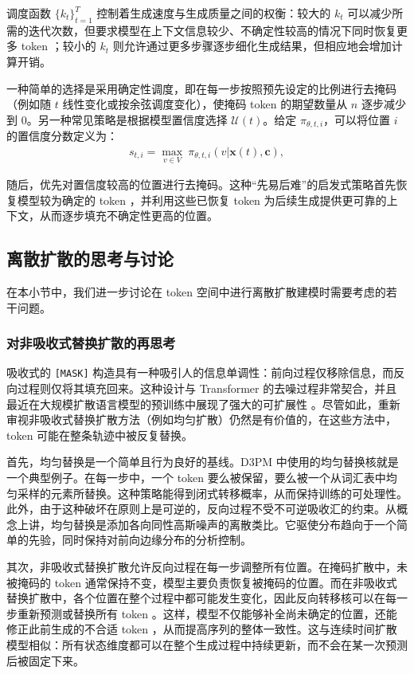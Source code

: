 \noindent 调度函数 $\{k_t\}_{t=1}^T$ 控制着生成速度与生成质量之间的权衡：较大的 $k_t$ 可以减少所需的迭代次数，但要求模型在上下文信息较少、不确定性较高的情况下同时恢复更多 token ；较小的 $k_t$ 则允许通过更多步骤逐步细化生成结果，但相应地会增加计算开销。

一种简单的选择是采用确定性调度，即在每一步按照预先设定的比例进行去掩码（例如随 $t$ 线性变化或按余弦调度变化），使掩码 token 的期望数量从 $n$ 逐步减少到 $0$。另一种常见策略是根据模型置信度选择 $\mathcal{U}(t)$。给定 $\pi_{\theta,t,i}$，可以将位置 $i$ 的置信度分数定义为：
\begin{eqnarray}
s_{t,i} = \max_{v\in V}\ \pi_{\theta,t,i}\!\left(v| \mathbf{x}(t),\mathbf{c}\right),
\end{eqnarray}

\noindent 随后，优先对置信度较高的位置进行去掩码。这种“先易后难”的启发式策略首先恢复模型较为确定的 token ，并利用这些已恢复 token 为后续生成提供更可靠的上下文，从而逐步填充不确定性更高的位置。

\subsection{离散扩散的思考与讨论}

在本小节中，我们进一步讨论在 token 空间中进行离散扩散建模时需要考虑的若干问题。

\subsubsection{对非吸收式替换扩散的再思考}
\label{sec:rethink-non-absorbing}

吸收式的 \texttt{[MASK]} 构造具有一种吸引人的信息单调性：前向过程仅移除信息，而反向过程则仅将其填充回来。这种设计与 Transformer 的去噪过程非常契合，并且最近在大规模扩散语言模型的预训练中展现了强大的可扩展性 \citep{sahoo-etal:2024simple,nie-etal:2025large}。尽管如此，重新审视非吸收式替换扩散方法（例如均匀扩散）仍然是有价值的，在这些方法中， token 可能在整条轨迹中被反复替换。

首先，均匀替换是一个简单且行为良好的基线。D3PM 中使用的均匀替换核就是一个典型例子。在每一步中，一个 token 要么被保留，要么被一个从词汇表中均匀采样的元素所替换。这种策略能得到闭式转移概率，从而保持训练的可处理性。此外，由于这种破坏在原则上是可逆的，反向过程不受不可逆吸收汇的约束。从概念上讲，均匀替换是添加各向同性高斯噪声的离散类比。它驱使分布趋向于一个简单的先验，同时保持对前向边缘分布的分析控制。

其次，非吸收式替换扩散允许反向过程在每一步调整所有位置。在掩码扩散中，未被掩码的 token 通常保持不变，模型主要负责恢复被掩码的位置。而在非吸收式替换扩散中，各个位置在整个过程中都可能发生变化，因此反向转移核可以在每一步重新预测或替换所有 token 。这样，模型不仅能够补全尚未确定的位置，还能修正此前生成的不合适 token ，从而提高序列的整体一致性。这与连续时间扩散模型相似：所有状态维度都可以在整个生成过程中持续更新，而不会在某一次预测后被固定下来。

